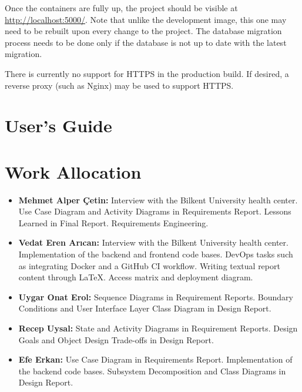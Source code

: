 \documentclass[a4paper, 12pt, titlepage]{article}
\begin{document}
  Once the containers are fully up, the project should be visible at \url{http://localhost:5000/}.
  Note that unlike the development image, this one may need to be rebuilt upon every change to the project.
  The database migration process needs to be done only if the database is not up to date with the latest migration.
  
  There is currently no support for HTTPS in the production build.
  If desired, a reverse proxy (such as Nginx) may be used to support HTTPS.
  
  \pagebreak
  \section{User's Guide}

  
  
  \pagebreak
  \section{Work Allocation}
  
  \begin{itemize}
    \item \textbf{Mehmet Alper Çetin:}
      Interview with the Bilkent University health center.
      Use Case Diagram and Activity Diagrams in Requirements Report.
      Lessons Learned in Final Report.
      Requirements Engineering.
    \item \textbf{Vedat Eren Arıcan:}
      Interview with the Bilkent University health center.
      Implementation of the backend and frontend code bases.
      DevOps tasks such as integrating Docker and a GitHub CI workflow.
      Writing textual report content through \LaTeX{}. Access matrix and deployment diagram.
    \item \textbf{Uygar Onat Erol:}
      Sequence Diagrams in Requirement Reports.
      Boundary Conditions and User Interface Layer Class Diagram in Design Report.
    \item \textbf{Recep Uysal:}
      State and Activity Diagrams in Requirement Reports.
      Design Goals and Object Design Trade-offs in Design Report.
    \item \textbf{Efe Erkan:}
      Use Case Diagram in Requirements Report.
      Implementation of the backend code bases.
      Subsystem Decomposition and Class Diagrams in Design Report.
  \end{itemize}
\end{document}
